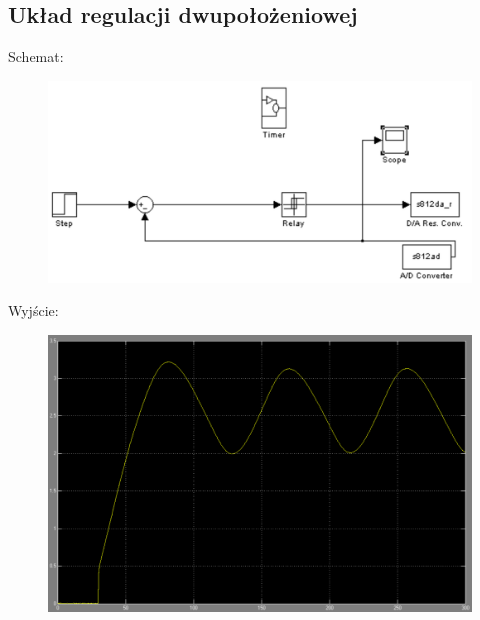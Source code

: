 \documentclass[a4paper]{article}
\begin{document}
		\subsection{Układ regulacji dwupołożeniowej}
			Schemat:
			\begin{figure}[H]
				\centering
				\includegraphics[width=\textwidth]{./img/relay_algo.png}
			\end{figure}
			\newpage
			Wyjście:
			\begin{figure}[H]
				\centering
				\includegraphics[width=\textwidth]{./img/relay_out.png}
			\end{figure}
\end{document}
